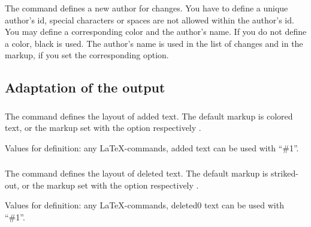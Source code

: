 \subsubsection{}

The command  defines a new author for changes.
You have to define a unique author's id, special characters or spaces are not allowed within the author's id.
You may define a corresponding color and the author's name.
If you do not define a color, black is used.
The author's name is used in the list of changes and in the markup, if you set the corresponding option.




\subsection{Adaptation of the output}
\label{sec:user:customizingoutput}


\subsubsection{}
\DescribeMacro{\setaddedmarkup}

The command  defines the layout of added text.
The default markup is colored text, or the markup set with the option  respectively .

Values for definition: any \LaTeX-commands, added text can be used with ``\#1''.




\subsubsection{}
\DescribeMacro{\setdeletedmarkup}

The command  defines the layout of deleted text.
The default markup is striked-out, or the markup set with the option  respectively .

Values for definition: any \LaTeX-commands, deleted0 text can be used with ``\#1''.




